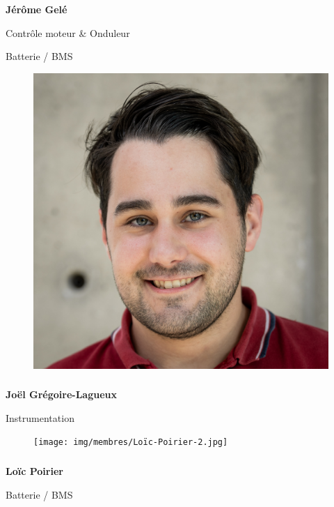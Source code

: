 \documentclass[a0paper,portrait]{baposter}
\begin{document}
\begin{poster}
{\subsubsection*{}
\vspace{2mm}
\textbf{Jérôme Gelé}

Contrôle moteur \& Onduleur

Batterie / BMS

\begin{figure}
\includegraphics[width=.9\linewidth]{img/membres/Joël-Grégoire-Lagueux-1.jpg} 
\end{figure}
\subsubsection*{}
\vspace{2mm}
\textbf{Joël Grégoire-Lagueux}

Instrumentation

\begin{figure}
\texttt{[image: img/membres/Loïc-Poirier-2.jpg]} 
\end{figure}
\subsubsection*{}
\vspace{-2mm}
\textbf{Loïc Poirier}

Batterie / BMS

}
\end{poster}
\end{document}
